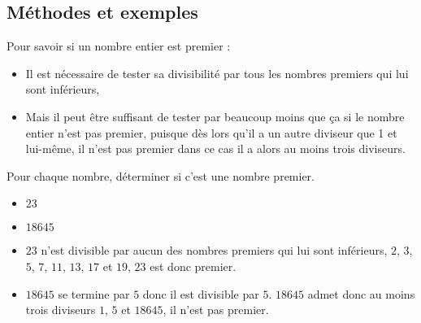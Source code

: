 \subsection{Méthodes et exemples}
\begin{methode}
	Pour savoir si un nombre entier est premier :
	\begin{itemize}
		\item Il est nécessaire de tester sa divisibilité par tous les nombres premiers qui lui sont inférieurs,
		\item Mais il peut être suffisant de tester par beaucoup moins que ça si le nombre entier n'est pas premier, puisque dès lors qu'il a un autre diviseur que 1 et lui-même, il n'est pas premier dans ce cas il a alors au moins trois diviseurs. 
	\end{itemize}
	\exercice
	Pour chaque nombre, déterminer si c'est une nombre premier.
	
	\begin{itemize}
		\item $23$
		\item $\num{18645}$
	\end{itemize}

	\correction
	\begin{itemize}
		\item $23$ n'est divisible par aucun des nombres premiers qui lui sont inférieurs, $2$, $3$, $5$, $7$, $11$, $13$, $17$ et $19$, $23$ est donc premier.
		\item $\num{18645}$ se termine par $5$ donc il est divisible par $5$.
		$\num{18645}$ admet donc au moins trois diviseurs $1$, $5$ et $\num{18645}$, il n'est pas premier.
	\end{itemize}
\end{methode}

